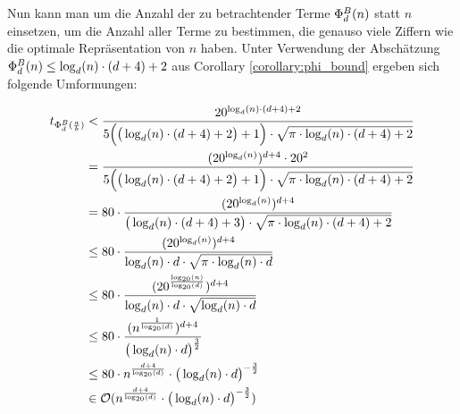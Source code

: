 \documentclass{article}
\theoremstyle{nonumberplain}
\begin{document}
Nun kann man um die Anzahl der zu betrachtender Terme \(\Phi_{d}^{B}(n)\) statt \(n\) einsetzen, um die Anzahl aller Terme zu bestimmen, die genauso viele Ziffern wie die optimale Repräsentation von \(n\) haben.
Unter Verwendung der Abschätzung \(\Phi_{d}^{B}(n) \leq \log_d(n) \cdot (d+4) + 2\) aus Corollary \ref{corollary:phi_bound} ergeben sich folgende Umformungen:

\begin{align*}
    t_{\Phi_{d}^{B}(\frac{a}{b})}
    &< \frac{20^{\log_d(n)\cdot(d+4)+2}}{5\Big(\big(\log_d(n) \cdot (d+4)+2\big)+1\Big) \cdot \sqrt{\pi \cdot \log_d(n) \cdot (d+4) + 2}} \\
    &= \frac{(20^{\log_d(n)})^{d+4}\cdot20^2}{5\Big(\big(\log_d(n) \cdot (d+4)+2\big)+1\Big) \cdot \sqrt{\pi \cdot \log_d(n) \cdot (d + 4) + 2}} \\
    &= 80\cdot\frac{(20^{\log_d(n)})^{d+4}}{\big(\log_d(n) \cdot (d+4)+3\big) \cdot\sqrt{\pi \cdot \log_d(n)\cdot(d+4)+2}} \\
    &\leq 80\cdot\frac{(20^{\log_d(n)})^{d+4}}{\log_d(n) \cdot d \cdot \sqrt{\pi \cdot \log_d(n) \cdot d}} \\
    &\leq 80\cdot\frac{(20^{\frac{\log_{20}(n)}{\log_{20}(d)}})^{d+4}}{\log_d(n) \cdot d \cdot \sqrt{\log_d(n) \cdot d}} \\
    &\leq 80\cdot\frac{(n^{\frac{1}{\log_{20}(d)}})^{d+4}}{\big(\log_d(n) \cdot d\big)^{\frac{3}{2}}} \\
    &\leq 80 \cdot n^{\frac{d+4}{\log_{20}(d)}} \cdot \big(\log_d(n) \cdot d\big)^{-\frac{3}{2}} \\
    &\in \mathcal{O}(n^{\frac{d+4}{\log_{20}(d)}} \cdot \big(\log_d(n) \cdot d\big)^{-\frac{3}{2}}) \\
\end{align*}
\end{document}
